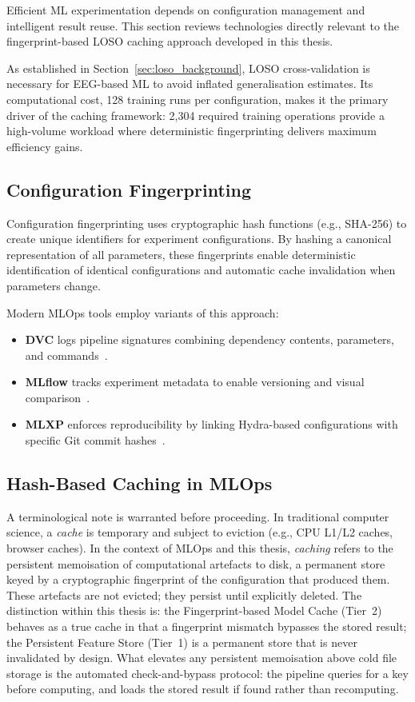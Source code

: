 Efficient ML experimentation depends on configuration management and intelligent
result reuse. This section reviews technologies directly relevant to the
fingerprint-based LOSO caching approach developed in this thesis.

As established in Section~\ref{sec:loso_background}, LOSO cross-validation
is necessary for EEG-based ML to avoid inflated generalisation estimates.
Its computational cost, 128 training runs per configuration, makes it
the primary driver of the caching framework: 2{,}304 required training
operations provide a high-volume workload where deterministic fingerprinting
delivers maximum efficiency gains.

\subsection{Configuration Fingerprinting}

Configuration fingerprinting uses cryptographic hash functions (e.g., SHA-256) 
to create unique identifiers for experiment configurations. By hashing a 
canonical representation of all parameters, these fingerprints enable 
deterministic identification of identical configurations and automatic 
cache invalidation when parameters change.

Modern MLOps tools employ variants of this approach:
\begin{itemize}
 \item \textbf{DVC} logs pipeline signatures combining dependency contents, 
 parameters, and commands~\cite{dvc_pipelines}.
 \item \textbf{MLflow} tracks experiment metadata to enable versioning and 
 visual comparison~\cite{zaharia2018mlflow}.
 \item \textbf{MLXP} enforces reproducibility by linking Hydra-based 
 configurations with specific Git commit hashes~\cite{arbel2024mlxp}.
\end{itemize}

\subsection{Hash-Based Caching in MLOps}

A terminological note is warranted before proceeding. In traditional computer
science, a \textit{cache} is temporary and subject to eviction (e.g., CPU
L1/L2 caches, browser caches). In the context of MLOps and this thesis,
\textit{caching} refers to the persistent memoisation of computational
artefacts to disk, a permanent store keyed by a cryptographic fingerprint
of the configuration that produced them. These artefacts are not evicted;
they persist until explicitly deleted. The distinction within this thesis is:
the Fingerprint-based Model Cache (Tier~2) behaves as a true cache in that
a fingerprint mismatch bypasses the stored result; the Persistent Feature
Store (Tier~1) is a permanent store that is never invalidated by design.
What elevates any persistent memoisation above cold file storage is the
automated check-and-bypass protocol: the pipeline queries for a key before
computing, and loads the stored result if found rather than recomputing.

